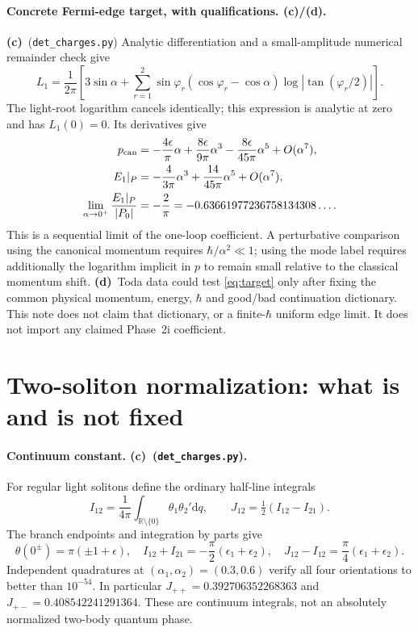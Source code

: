 \documentclass[11pt,a4paper]{article}
\newcommand{\Lc}{\textbf{(c)}}
\newcommand{\Ld}{\textbf{(d)}}
\newcommand{\Ccheck}{\texttt{det\_charges.py}}
\newcommand{\dd}{\mathrm d}
\newcommand{\R}{\mathbb R}
\begin{document}
\paragraph{Concrete Fermi-edge target, with qualifications. \Lc/\Ld.}
\Lc\ (\Ccheck) Analytic differentiation and a small-amplitude numerical
remainder check give
\begin{equation}
 L_1=\frac1{2\pi}\left[3\sin\alpha+
 \sum_{r=1}^2\sin\varphi_r(\cos\varphi_r-\cos\alpha)
                         \log|\tan(\varphi_r/2)|\right].
\end{equation}
The light-root logarithm cancels identically; this expression is analytic
at zero and has $L_1(0)=0$. Its derivatives give
\begin{align}
 p_{\rm can}&=-\frac{4\epsilon}{\pi}\alpha
       +\frac{8\epsilon}{9\pi}\alpha^3
       -\frac{8\epsilon}{45\pi}\alpha^5+O(\alpha^7),\\
 E_1|_P&=-\frac4{3\pi}\alpha^3+\frac{14}{45\pi}\alpha^5+O(\alpha^7),\\
 \lim_{\alpha\to0^+}\frac{E_1|_P}{|P_0|}&=-\frac2\pi
       =-0.63661977236758134308\ldots .\label{eq:target}
\end{align}
This is a sequential limit of the one-loop coefficient. A perturbative
comparison using the canonical momentum requires $\hbar/\alpha^2\ll1$;
using the mode label requires additionally the logarithm implicit in $p$ to
remain small relative to the classical momentum shift. \Ld\ Toda data could
test \eqref{eq:target} only after fixing the common physical momentum,
energy, $\hbar$ and good/bad continuation dictionary. This note does not
claim that dictionary, or a finite-$\hbar$ uniform edge limit. It does not
import any claimed Phase~2i coefficient.

\section{Two-soliton normalization: what is and is not fixed}
\paragraph{Continuum constant. \Lc\ (\Ccheck).}
For regular light solitons define the ordinary half-line integrals
\begin{equation}
 I_{12}=\frac1{4\pi}\int_{\R\setminus\{0\}}\theta_1\theta_2'\dd q,
 \qquad J_{12}=\tfrac12(I_{12}-I_{21}).
\end{equation}
The branch endpoints and integration by parts give
\begin{equation}
 \theta(0^\pm)=\pi(\pm1+\epsilon),\quad
 I_{12}+I_{21}=-\frac\pi2(\epsilon_1+\epsilon_2),\quad
 J_{12}-I_{12}=\frac\pi4(\epsilon_1+\epsilon_2).\label{eq:exchange}
\end{equation}
Independent quadratures at $(\alpha_1,\alpha_2)=(0.3,0.6)$ verify all four
orientations to better than $10^{-54}$. In particular $J_{++}=0.392706352268363$
and $J_{+-}=0.408542241291364$. These are continuum integrals, not an
absolutely normalized two-body quantum phase.
\end{document}
